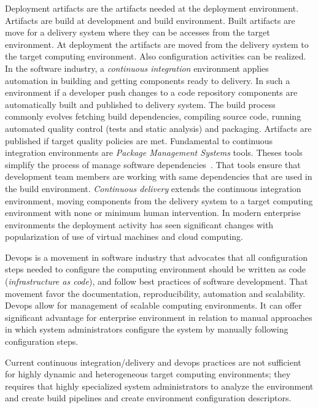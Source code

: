 Deployment artifacts are the artifacts needed at the deployment environment. Artifacts are build at development and build environment. Built artifacts are move for a delivery system where they can be accesses from the target environment. At deployment the artifacts are moved from the delivery system to the target computing environment. Also configuration activities can be realized.
In the software industry, a \emph{continuous integration} environment applies automation in building and getting components ready to delivery. In such a environment if a developer push changes to a code repository components are automatically built and published to delivery system. The build process commonly evolves fetching build dependencies, compiling source code, running automated quality control (tests and static analysis) and packaging. Artifacts are published if target quality policies are met.
Fundamental to continuous integration environments are \emph{Package Management Systems} tools. Theses tools simplify the process of manage software dependencies~\cite{spinellis_package_2012}. That tools ensure that development team members are working with same dependencies that are used in the build environment.
\emph{Continuous delivery} extends the continuous integration environment, moving components from the delivery system to a target computing environment with none or minimum human intervention.
In modern enterprise environments the deployment activity has seen significant changes with popularization of use of virtual machines and cloud computing.

Devops\cite{bang_grounded_2013} is a movement in software industry that advocates that all configuration steps needed to configure the computing environment should be written as code (\emph{infrastructure as code}), and follow best practices of software development. That movement favor the documentation, reproducibility, automation and scalability.
Devops allow for management of scalable computing environments. It can offer significant advantage for enterprise environment in relation to manual approaches in which system administrators configure the system by manually following configuration steps.

Current continuous integration/delivery and devops practices are not sufficient for highly dynamic and heterogeneous target computing environments; they requires that highly specialized system administrators to analyze the environment and create build pipelines and create environment configuration descriptors.
